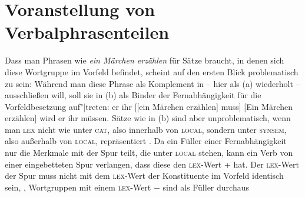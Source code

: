 \section{Voranstellung von Verbalphrasenteilen}
\label{sec-pvp}

Dass man Phrasen wie \emph{ein Märchen erzählen} für Sätze braucht, in denen sich diese Wortgruppe im Vorfeld
befindet, scheint auf den ersten Blick problematisch zu sein: Während man diese Phrase als Komplement
in  -- hier als (a) wiederholt -- ausschließen will,
soll sie in (b) als Binder der Fernabhängigkeit
für die Vorfeldbesetzung auf"|treten:
\largerpage\enlargethispage{4pt}
\eal
\ex er ihr [[ein Märchen erzählen] muss]
\ex {}[Ein Märchen erzählen] wird er ihr müssen.
\zl
Sätze wie in (b) sind aber unproblematisch, wenn man \textsc{lex} nicht wie \citet[]{ps2}
unter \textsc{cat}, also innerhalb von \textsc{local}, sondern unter \textsc{synsem}, also außerhalb von
\textsc{local}, repräsentiert \parencites[802]{Mueller96a}[356--357]{Mueller99a}[97]{Mueller2002b}[Abschnitt~2.2]{Meurers99a}.
Da ein Füller einer Fernabhängigkeit nur die Merkmale mit der Spur teilt, die unter \textsc{local} stehen,
kann ein Verb von einer eingebetteten Spur verlangen, dass diese den \textsc{lex}-Wert + hat. Der \textsc{lex}-Wert
der Spur muss nicht mit dem \textsc{lex}-Wert der Konstituente im Vorfeld identisch sein,
\dash, Wortgruppen mit einem \textsc{lex}-Wert $-$ sind als Füller durchaus
